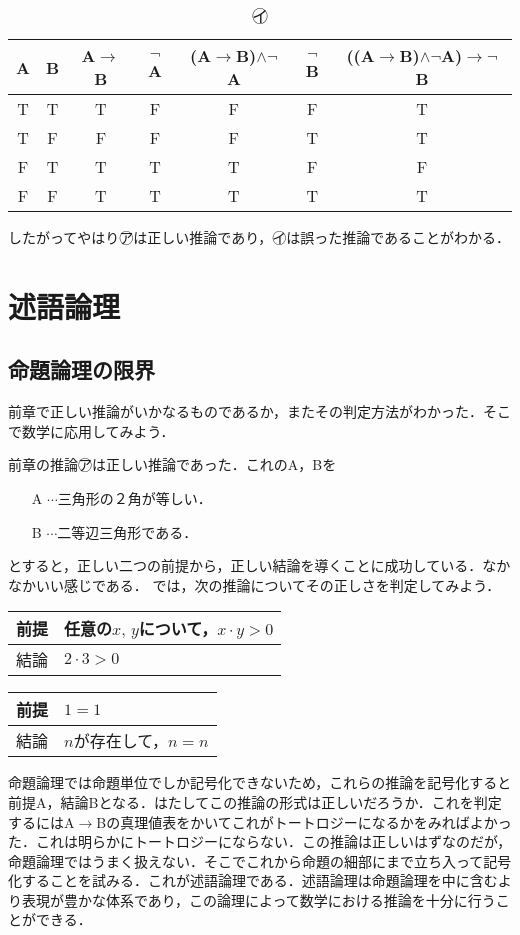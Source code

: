 \documentclass[10pt,b5paper,papersize,dvipdfmx]{jsbook}
\begin{document}
\begin{table}[H]
\begin{center}
\caption{\textcircled{\scriptsize イ}}
\begin{tabular}{|c|c||c|c|c|c|c|}\hline
A&B&A$\to$B&$\lnot$A&(A$\to$B)$\land\lnot$A&$\lnot$B&((A$\to$B)$\land\lnot$A)$\to\lnot$B \\ \hline \hline
T&T&T&F&F&F&T \\ \hline
T&F&F&F&F&T&T \\ \hline
F&T&T&T&T&F&F \\ \hline
F&F&T&T&T&T&T \\ \hline
\end{tabular}
\end{center}
\end{table}
したがってやはり\textcircled{\scriptsize ア}は正しい推論であり，\textcircled{\scriptsize イ}は誤った推論であることがわかる．

\section{述語論理}
\subsection{命題論理の限界}
前章で正しい推論がいかなるものであるか，またその判定方法がわかった．そこで数学に応用してみよう．\par
前章の推論\textcircled{\scriptsize ア}は正しい推論であった．これのA，Bを
\begin{itemize}
\item[A]$\cdots$三角形の２角が等しい．
\item[B]$\cdots$二等辺三角形である．
\end{itemize}
とすると，正しい二つの前提から，正しい結論を導くことに成功している．なかなかいい感じである．
では，次の推論についてその正しさを判定してみよう．
\begin{table}[H]
\begin{tabular}{ll}
前提&任意の$x, \, y$について，$x\cdot y>0$ \\ \hline
結論&$2\cdot 3>0$\\
\end{tabular}
\end{table}
\begin{table}[H]
\begin{tabular}{ll}
前提&$1=1$ \\ \hline
結論&$n$が存在して，$n=n$\\
\end{tabular}
\end{table}
命題論理では命題単位でしか記号化できないため，これらの推論を記号化すると前提A，結論Bとなる．はたしてこの推論の形式は正しいだろうか．これを判定するにはA$\to$Bの真理値表をかいてこれがトートロジーになるかをみればよかった．これは明らかにトートロジーにならない．この推論は正しいはずなのだが，命題論理ではうまく扱えない．そこでこれから命題の細部にまで立ち入って記号化することを試みる．これが述語論理である．述語論理は命題論理を中に含むより表現が豊かな体系であり，この論理によって数学における推論を十分に行うことができる．
\end{document}
